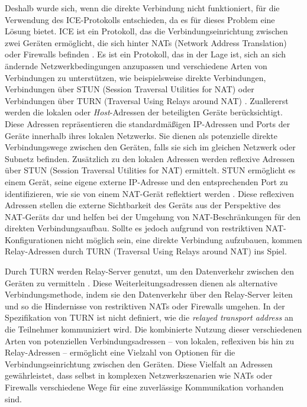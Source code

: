 \noindent Deshalb wurde sich, wenn die direkte Verbindung nicht funktioniert, für die Verwendung des ICE-Protokolls entschieden, da es für dieses Problem eine Lösung bietet.
ICE ist ein Protokoll, das die Verbindungseinrichtung zwischen zwei Geräten ermöglicht, die sich hinter NATs (Network Address Translation) oder Firewalls befinden \parencite[S. 6 ff.]{rfc8445_ICE}. Es ist ein Protokoll, das in der Lage ist, sich an sich ändernde Netzwerkbedingungen anzupassen und verschiedene Arten von Verbindungen zu unterstützen, wie beispielsweise direkte Verbindungen, Verbindungen über STUN (Session Traversal Utilities for NAT) oder Verbindungen über TURN (Traversal Using Relays around NAT) \parencite[S. 1]{rfc8445_ICE}. 
Zuallererst werden die lokalen oder \textit{Host}-Adressen der beteiligten Geräte berücksichtigt. Diese Adressen repräsentieren die standardmäßigen IP-Adressen und Ports der Geräte innerhalb ihres lokalen Netzwerks. Sie dienen als potenzielle direkte Verbindungswege zwischen den Geräten, falls sie sich im gleichen Netzwerk oder Subnetz befinden. 
Zusätzlich zu den lokalen Adressen werden reflexive Adressen über STUN (Session Traversal Utilities for NAT) ermittelt. STUN ermöglicht es einem Gerät, seine eigene externe IP-Adresse und den entsprechenden Port zu identifizieren, wie sie von einem NAT-Gerät reflektiert werden \parencite[S. 4]{rfc8489_STUN}. Diese reflexiven Adressen stellen die externe Sichtbarkeit des Geräts aus der Perspektive des NAT-Geräts dar und helfen bei der Umgehung von NAT-Beschränkungen für den direkten Verbindungsaufbau. Sollte es jedoch aufgrund von restriktiven NAT-Konfigurationen nicht möglich sein, eine direkte Verbindung aufzubauen, kommen Relay-Adressen durch TURN (Traversal Using Relays around NAT) ins Spiel.

Durch TURN werden Relay-Server genutzt, um den Datenverkehr zwischen den Geräten zu vermitteln \parencite[S. 10 f.]{rfc8656_TURN}. Diese Weiterleitungsadressen dienen als alternative Verbindungsmethode, indem sie den Datenverkehr über den Relay-Server leiten und so die Hindernisse von restriktiven NATs oder Firewalls umgehen. In der Spezifikation von TURN ist nicht definiert, wie die \textit{relayed transport address} an die Teilnehmer kommuniziert wird.
Die kombinierte Nutzung dieser verschiedenen Arten von potenziellen Verbindungsadressen – von lokalen, reflexiven bis hin zu Relay-Adressen – ermöglicht eine Vielzahl von Optionen für die Verbindungseinrichtung zwischen den Geräten. Diese Vielfalt an Adressen gewährleistet, dass selbst in komplexen Netzwerkszenarien wie NATs oder Firewalls verschiedene Wege für eine zuverlässige Kommunikation vorhanden sind.



